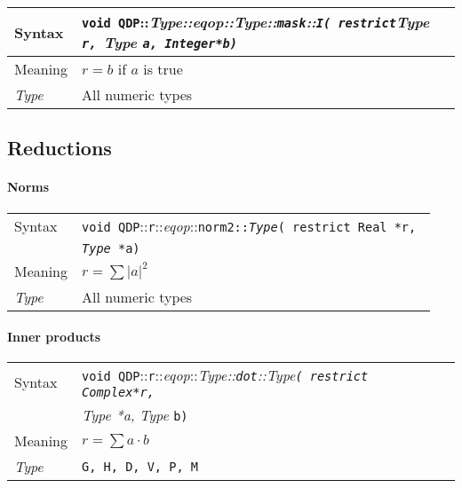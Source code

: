 \documentclass[12pt,letterpaper]{article}
\newcommand{\tReal}{Real}
\newcommand{\tComplex}{Complex}
\newcommand{\tInt}{Integer}
\newcommand{\namespace}{QDP}
\newcommand{\allNumericTypes}{All numeric types}
\newcommand{\ttdash}{{::}}
\newcommand{\itt}{\it Type}
\newcommand{\extraarg}{}
\newcommand{\protoUnarySingleTypesQual}[5]{{\tt void \namespace}\ttdash{\tt #1}\ttdash{\it eqop}\ttdash#2\ttdash{\tt #3}{\tt ( restrict #4 *r, }\\
  & {\tt #5 *a\extraarg)}}
\begin{document}
\begin{flushleft}
  \begin{tabular}{|l|l|}
  \hline
  Syntax      & {\tt void \namespace}\ttdash\itt\ttdash{\it eqop}\ttdash\itt\ttdash{\tt mask}\ttdash{\tt I}{\tt ( restrict}{\it Type }{\tt *r, }{\it Type }{\tt *a, }{\tt \tInt *b\extraarg)} \\
  \hline
  Meaning     & $r = b$ if $a$ is true\\
  \hline
  \itt        & \allNumericTypes \\
  \hline
  \end{tabular}
\end{flushleft}

\subsection{Reductions}

\paragraph{Norms}

\begin{flushleft}
  \begin{tabular}{|l|l|}
  \hline
  Syntax      & \protoUnarySingleTypesQual{r}{\tt norm2}{\itt}{\tReal}{{\it Type}} \\
  \hline
  Meaning     & $r = \sum |a|^2$ \\
  \hline
  \itt        & \allNumericTypes \\
  \hline
  \end{tabular}
\end{flushleft}

\paragraph{Inner products}

\begin{flushleft}
  \begin{tabular}{|l|l|}
  \hline
  Syntax      & {\tt void \namespace}\ttdash{\tt r}\ttdash{\it eqop}\ttdash\itt\ttdash{\tt dot}\ttdash\itt{\tt ( restrict \tComplex *r, }\\
              & {\it Type *a, }{\it Type }{\tt *b\extraarg)} \\
  \hline
  Meaning     & $r = \sum a \cdot b$ \\
  \hline
  \itt        & {\tt G, H, D, V, P, M} \\
  \hline
  \end{tabular}
\end{flushleft}
\end{document}
